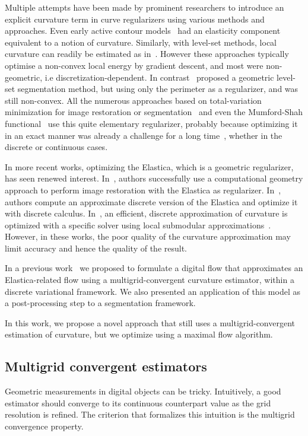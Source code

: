 \documentclass[runningheads]{llncs}
\begin{document}
Multiple attempts have been made by prominent researchers to introduce
an explicit curvature term in curve regularizers using various methods
and approaches. Even early active contour models~\cite{kass88} had an
elasticity component equivalent to a notion of curvature. Similarly,
with level-set methods, local curvature can readily be estimated as
in~\cite{malladi1995shape}. However these approaches typically
optimise a non-convex local energy by gradient descent, and most were
non-geometric, i.e discretization-dependent. In
contrast~\cite{caselles97} proposed a geometric level-set segmentation
method, but using only the perimeter as a regularizer, and was still
non-convex. All the numerous approaches based on total-variation
minimization for image restoration or
segmentation~\cite{rudin1992nonlinear} and even the Mumford-Shah
functional~\cite{mumford89} use this quite elementary regularizer,
probably because optimizing it in an exact manner was already a
challenge for a long
time~\cite{boykov01fast,chambolle04,appleton2005globally}, whether in
the discrete or continuous cases.

In more recent works, optimizing the Elastica, which is a geometric regularizer, has seen renewed
interest. In~\cite{masnou98inpainting}, authors successfully use a computational geometry approach to perform image
restoration with the Elastica as regularizer. In~\cite{zehiry10fast}, authors compute an approximate discrete version of
the Elastica and optimize it with discrete calculus. In~\cite{nieuwenhuis14efficient}, an efficient, discrete
approximation of curvature is optimized with a specific solver using local submodular
approximations~\cite{gorelick14local}. However, in these works, the poor quality of the curvature approximation may limit accuracy and hence the quality of the result.

In a previous work~\cite{antunes2020elastica} we proposed to formulate a digital flow that approximates an
Elastica-related flow using a multigrid-convergent curvature estimator, within a discrete variational
framework. We also presented an application of this model as a post-processing step to a segmentation framework.

In this work, we propose a novel approach that still uses a
multigrid-convergent estimation of curvature, but we optimize using a
maximal flow algorithm.

\subsection{Multigrid convergent estimators}
Geometric measurements in digital objects can be tricky.  Intuitively, a good estimator should converge to its
continuous counterpart value as the grid resolution is refined. The criterion that formalizes this intuition is the
multigrid convergence property.
\end{document}
